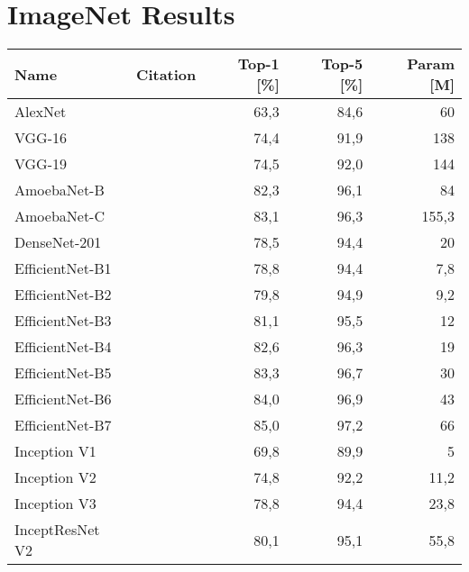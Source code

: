 \chapter{ImageNet Results}
\vspace*{-12pt}
\begin{longtabu} to \textwidth {ll|r|r|r}
\toprule
Name & Citation & Top-1 [\%] & Top-5 [\%] & Param [M] \\
\bottomrule
\toprule
AlexNet         & \citet{krizhevsky2012imagenet} & 63,3    & 84,6   &  60  \\
\bottomrule
VGG-16          & \citet{simonyan2014very}       & 74,4    & 91,9    & 138     \\
VGG-19          & \citet{simonyan2014very}       & 74,5    & 92,0    & 144    \\
\bottomrule
AmoebaNet-B   & \citet{real2019regularized}    & 82,3    & 96,1    & 84      \\
AmoebaNet-C   & \citet{real2019regularized}    & 83,1    & 96,3    & 155,3      \\
\bottomrule
DenseNet-201  & \citet{huang2017densely}       & 78,5    & 94,4    & 20      \\
\bottomrule
EfficientNet-B1  & \citet{tan2019efficientnet}  & 78,8     & 94,4     & 7,8     \\
EfficientNet-B2  & \citet{tan2019efficientnet}  & 79,8     & 94,9     & 9,2      \\
EfficientNet-B3  & \citet{tan2019efficientnet}  & 81,1     & 95,5     & 12      \\
EfficientNet-B4  & \citet{tan2019efficientnet}  & 82,6     & 96,3     & 19      \\
EfficientNet-B5  & \citet{tan2019efficientnet}  & 83,3     & 96,7     & 30      \\
EfficientNet-B6  & \citet{tan2019efficientnet}  & 84,0     & 96,9     & 43      \\
EfficientNet-B7  & \citet{tan2019efficientnet}  & 85,0     & 97,2     & 66      \\
\bottomrule
Inception V1        & \citet{szegedy2015going}       & 69,8     & 89,9     & 5      \\
Inception V2        & \citet{ioffe2015batch}         & 74,8     & 92,2     & 11,2      \\
Inception V3        & \citet{szegedy2016rethinking}  & 78,8     & 94,4     & 23,8       \\
InceptResNet V2     & \citet{szegedy2017inception}   & 80,1     & 95,1     & 55,8     \\

\end{longtabu}
